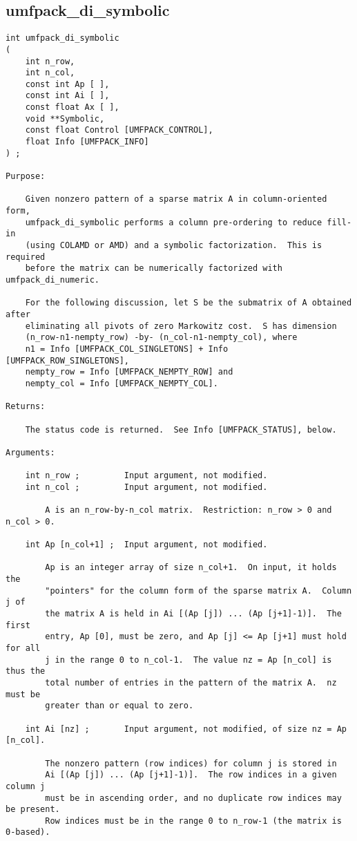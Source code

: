 \documentclass[11pt]{article}
\begin{document}
\subsection{umfpack\_di\_symbolic}

{\footnotesize
\begin{verbatim}
int umfpack_di_symbolic
(
    int n_row,
    int n_col,
    const int Ap [ ],
    const int Ai [ ],
    const float Ax [ ],
    void **Symbolic,
    const float Control [UMFPACK_CONTROL],
    float Info [UMFPACK_INFO]
) ;

Purpose:

    Given nonzero pattern of a sparse matrix A in column-oriented form,
    umfpack_di_symbolic performs a column pre-ordering to reduce fill-in
    (using COLAMD or AMD) and a symbolic factorization.  This is required
    before the matrix can be numerically factorized with umfpack_di_numeric.

    For the following discussion, let S be the submatrix of A obtained after
    eliminating all pivots of zero Markowitz cost.  S has dimension
    (n_row-n1-nempty_row) -by- (n_col-n1-nempty_col), where
    n1 = Info [UMFPACK_COL_SINGLETONS] + Info [UMFPACK_ROW_SINGLETONS],
    nempty_row = Info [UMFPACK_NEMPTY_ROW] and
    nempty_col = Info [UMFPACK_NEMPTY_COL].

Returns:

    The status code is returned.  See Info [UMFPACK_STATUS], below.

Arguments:

    int n_row ;         Input argument, not modified.
    int n_col ;         Input argument, not modified.

        A is an n_row-by-n_col matrix.  Restriction: n_row > 0 and n_col > 0.

    int Ap [n_col+1] ;  Input argument, not modified.

        Ap is an integer array of size n_col+1.  On input, it holds the
        "pointers" for the column form of the sparse matrix A.  Column j of
        the matrix A is held in Ai [(Ap [j]) ... (Ap [j+1]-1)].  The first
        entry, Ap [0], must be zero, and Ap [j] <= Ap [j+1] must hold for all
        j in the range 0 to n_col-1.  The value nz = Ap [n_col] is thus the
        total number of entries in the pattern of the matrix A.  nz must be
        greater than or equal to zero.

    int Ai [nz] ;       Input argument, not modified, of size nz = Ap [n_col].

        The nonzero pattern (row indices) for column j is stored in
        Ai [(Ap [j]) ... (Ap [j+1]-1)].  The row indices in a given column j
        must be in ascending order, and no duplicate row indices may be present.
        Row indices must be in the range 0 to n_row-1 (the matrix is 0-based).


\end{verbatim}}
\end{document}
